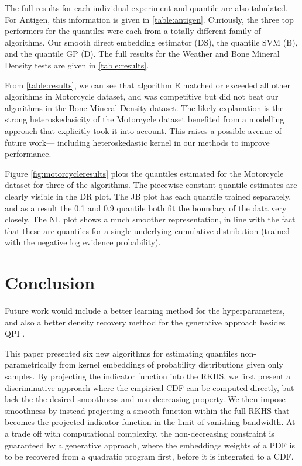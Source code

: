 \documentclass[twoside]{article} \usepackage{aistats2017}
\theoremstyle{definition}
\newcommand{\warn}[1]{{\color{red} #1}}
\newcommand{\qpi}{QPI }
\begin{document}
		The full results for each individual experiment and quantile are also tabulated. For Antigen, this information is given in \cref{table:antigen}. Curiously, the three top performers for the quantiles were each from a totally different family of algorithms. Our smooth direct embedding estimator (DS), the quantile SVM (B), and the quantile GP (D). The full results for the Weather and Bone Mineral Density tests are given in \cref{table:results}.
		
		From \cref{table:results}, we can see that algorithm E matched or exceeded all other algorithms in Motorcycle dataset, and was competitive but did not beat our algorithms in the Bone Mineral Density dataset. The likely explanation is the strong heteroskedasicity of the Motorcycle dataset benefited from a modelling approach that explicitly took it into account. This raises a possible avenue of future work--- including heteroskedastic kernel in our methods to improve performance.
		
		Figure \ref{fig:motorcycleresults} plots the quantiles estimated for the Motorcycle dataset for three of the algorithms. The piecewise-constant quantile estimates are clearly visible in the DR plot. The JB plot has each quantile trained separately, and as a result the 0.1 and 0.9 quantile both fit the boundary of the data very closely. The NL plot shows a much smoother representation, in line with the fact that these are quantiles for a single underlying cumulative distribution (trained with the negative log evidence probability).

\section{Conclusion}
\label{sec:conclusion}

	\warn{Future work would include a better learning method for the hyperparameters, and also a better density recovery method for the generative approach besides \qpi.}
	
	This paper presented six new algorithms for estimating quantiles non-parametrically from kernel embeddings of probability distributions given only samples. By projecting the indicator function into the RKHS, we first present a discriminative approach where the empirical CDF can be computed directly, but lack the the desired smoothness and non-decreasing property. We then impose smoothness by instead projecting a smooth function within the full RKHS that becomes the projected indicator function in the limit of vanishing bandwidth. At a trade off with computational complexity, the non-decreasing constraint is guaranteed by a generative approach, where the embeddings weights of a PDF is to be recovered from a quadratic program first, before it is integrated to a CDF.
	
\end{document}
